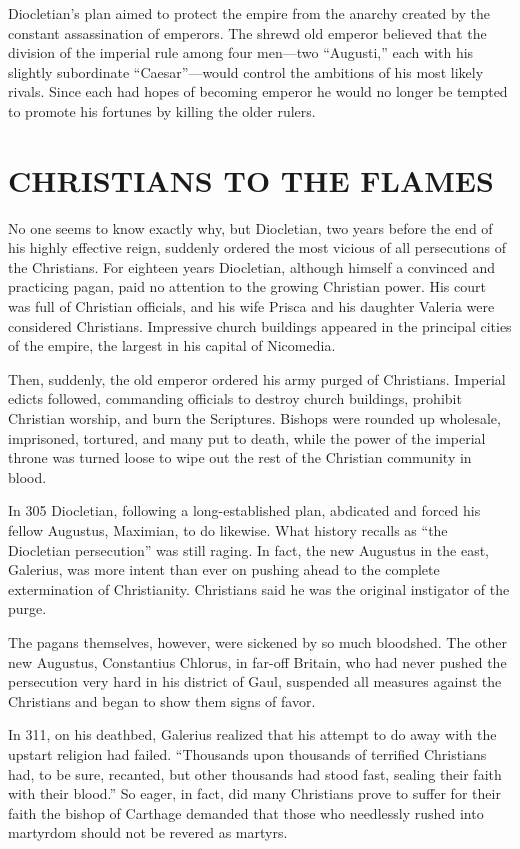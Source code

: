 Diocletian’s plan aimed to protect the empire from the anarchy created by the constant assassination
of emperors. The shrewd old emperor believed that the division of the imperial rule among four
men—two “Augusti,” each with his slightly subordinate “Caesar”—would control the ambitions of his
most likely rivals. Since each had hopes of becoming emperor he would no longer be tempted to
promote his fortunes by killing the older rulers.

\section{CHRISTIANS TO THE FLAMES}

No one seems to know exactly why, but Diocletian, two years before the end of his highly effective
reign, suddenly ordered the most vicious of all persecutions of the Christians. For eighteen years
Diocletian, although himself a convinced and practicing pagan, paid no attention to the growing
Christian power. His court was full of Christian officials, and his wife Prisca and his daughter
Valeria were considered Christians. Impressive church buildings appeared in the principal cities of
the empire, the largest in his capital of Nicomedia.

Then, suddenly, the old emperor ordered his army purged of Christians. Imperial edicts followed,
commanding officials to destroy church buildings, prohibit Christian worship, and burn the
Scriptures. Bishops were rounded up wholesale, imprisoned, tortured, and many put to death, while
the power of the imperial throne was turned loose to wipe out the rest of the Christian community in
blood.

In 305 Diocletian, following a long-established plan, abdicated and forced his fellow Augustus,
Maximian, to do likewise. What history recalls as “the Diocletian persecution” was still raging. In
fact, the new Augustus in the east, Galerius, was more intent than ever on pushing ahead to the
complete extermination of Christianity. Christians said he was the original instigator of the purge.

The pagans themselves, however, were sickened by so much bloodshed. The other new Augustus,
Constantius Chlorus, in far-off Britain, who had never pushed the persecution very hard in his
district of Gaul, suspended all measures against the Christians and began to show them signs of
favor.

In 311, on his deathbed, Galerius realized that his attempt to do away with the upstart religion had
failed. “Thousands upon thousands of terrified Christians had, to be sure, recanted, but other
thousands had stood fast, sealing their faith with their blood.” So eager, in fact, did many
Christians prove to suffer for their faith the bishop of Carthage demanded that those who needlessly
rushed into martyrdom should not be revered as martyrs.

